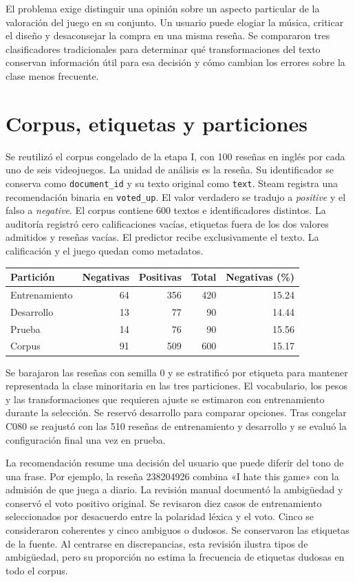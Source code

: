 \documentclass[11pt,letterpaper]{article}
\begin{document}
El problema exige distinguir una opinión sobre un aspecto particular de la valoración del juego en su conjunto. Un usuario puede elogiar la música, criticar el diseño y desaconsejar la compra en una misma reseña. Se compararon tres clasificadores tradicionales para determinar qué transformaciones del texto conservan información útil para esa decisión y cómo cambian los errores sobre la clase menos frecuente.
\section{Corpus, etiquetas y particiones}
Se reutilizó el corpus congelado de la etapa I, con 100 reseñas en inglés por cada uno de seis videojuegos. La unidad de análisis es la reseña. Su identificador se conserva como \texttt{document\_id} y su texto original como \texttt{text}. Steam registra una recomendación binaria en \texttt{voted\_up}. El valor verdadero se tradujo a \textit{positive} y el falso a \textit{negative}. El corpus contiene 600 textos e identificadores distintos. La auditoría registró cero calificaciones vacías, etiquetas fuera de los dos valores admitidos y reseñas vacías. El predictor recibe exclusivamente el texto. La calificación y el juego quedan como metadatos.

\begin{center}\begin{tabular}{lrrrr}\toprule
Partición & Negativas & Positivas & Total & Negativas (\%)\\\midrule
Entrenamiento &64&356&420&15.24\\
Desarrollo &13&77&90&14.44\\
Prueba &14&76&90&15.56\\\midrule
Corpus &91&509&600&15.17\\\bottomrule\end{tabular}\end{center}

Se barajaron las reseñas con semilla 0 y se estratificó por etiqueta para mantener representada la clase minoritaria en las tres particiones. El vocabulario, los pesos y las transformaciones que requieren ajuste se estimaron con entrenamiento durante la selección. Se reservó desarrollo para comparar opciones. Tras congelar C080 se reajustó con las 510 reseñas de entrenamiento y desarrollo y se evaluó la configuración final una vez en prueba.

La recomendación resume una decisión del usuario que puede diferir del tono de una frase. Por ejemplo, la reseña 238204926 combina «I hate this game» con la admisión de que juega a diario. La revisión manual documentó la ambigüedad y conservó el voto positivo original. Se revisaron diez casos de entrenamiento seleccionados por desacuerdo entre la polaridad léxica y el voto. Cinco se consideraron coherentes y cinco ambiguos o dudosos. Se conservaron las etiquetas de la fuente. Al centrarse en discrepancias, esta revisión ilustra tipos de ambigüedad, pero su proporción no estima la frecuencia de etiquetas dudosas en todo el corpus.
\end{document}
